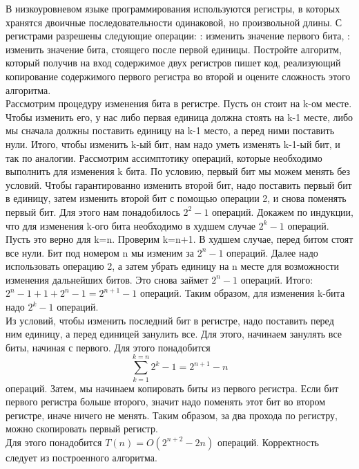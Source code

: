 \documentclass[12pt]{extreport}
\theoremstyle{definiton}
\theoremstyle{definition}
\theoremstyle{definition}
\begin{document}
	\Pr[4] В низкоуровневом языке программирования используются регистры, в которых хранятся двоичные последовательности одинаковой, но произвольной длины. С регистрами разрешены следующие операции: {:} изменить значение первого бита, {:} изменить значение бита, стоящего после первой единицы. Постройте алгоритм, который получив на вход содержимое двух регистров пишет код, реализующий копирование содержимого первого регистра во второй и оцените сложность этого алгоритма.
	\newline
	\\Рассмотрим процедуру изменения бита в регистре. Пусть он стоит на k-ом месте. Чтобы изменить его, у нас либо первая единица должна стоять на k-1 месте, либо мы сначала должны поставить единицу на k-1 место, а перед ними поставить нули. Итого, чтобы изменить k-ый бит, нам надо уметь изменять k-1-ый бит, и так по аналогии. Рассмотрим ассимптотику операций, которые необходимо выполнить для изменения k бита. По условию, первый бит мы можем менять без условий. Чтобы гарантированно изменить второй бит, надо поставить первый бит в единицу, затем изменить второй бит с помощью операции 2, и снова поменять первый бит. Для этого нам понадобилось $2^{2}-1$ операций. Докажем по индукции, что для изменения k-ого бита необходимо в худшем случае $2^{k}-1$ операций. Пусть это верно для k=n. Проверим k=n+1. В худшем случае, перед битом стоят все нули. Бит под номером n мы изменим за $2^{n}-1$ операций. Далее надо использовать операцию 2, а затем убрать единицу на n месте для возможности изменения дальнейших битов. Это снова займет $2^{n}-1$ операций. Итого: $2^{n}-1 + 1 + 2^{n}-1 = 2^{n+1}-1$ операций. Таким образом, для изменения k-бита надо $2^{k}-1$ операций. 
	\\Из условий, чтобы изменить последний бит в регистре, надо поставить перед ним единицу, а перед единицей занулить все. Для этого, начинаем занулять все биты, начиная с первого. Для этого понадобится \[ \sum_{k=1}^{k=n} 2^{k}-1 = 2^{n+1}-n \] операций. Затем, мы начинаем копировать биты из первого регистра. Если бит первого регистра больше второго, значит надо поменять этот бит во втором регистре, иначе ничего не менять. Таким образом, за два прохода по регистру, можно скопировать первый регистр. 
	\\Для этого понадобится $T(n)=O(2^{n+2}-2n)$ операций. Корректность следует из построенного алгоритма.

\newpage	
\end{document}

